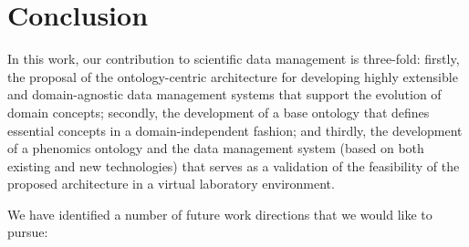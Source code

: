 \documentclass[preprint,12pt]{elsarticle}
\begin{document}
\section{Conclusion}\label{sec:concl}
In this work, our contribution to scientific data management is three-fold: firstly, the proposal of the ontology-centric architecture for developing highly extensible and domain-agnostic data management systems that support the evolution of domain concepts; secondly, the development of a base ontology that defines essential concepts in a domain-independent fashion; and thirdly, the development of a phenomics ontology and the data management system (based on both existing and new technologies) that serves as a validation of the feasibility of the proposed architecture in a virtual laboratory environment.

We have identified a number of future work directions that we would like to pursue:
\end{document}
